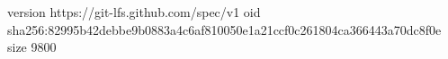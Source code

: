 version https://git-lfs.github.com/spec/v1
oid sha256:82995b42debbe9b0883a4c6af810050e1a21ccf0c261804ca366443a70dc8f0e
size 9800
